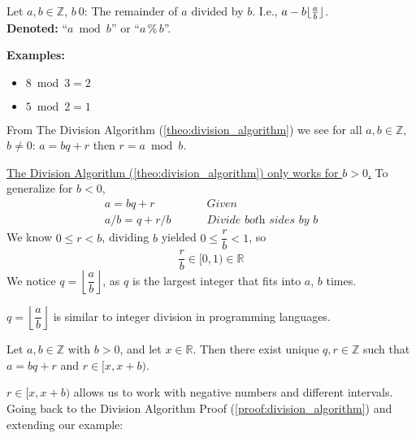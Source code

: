 \begin{Def}

    \label{def:mod_operator}

    Let $a,b\in\mathbb{Z}$, $b\>0$: The remainder of $a$ divided by $b$. I.e., $a-b\lfloor\frac{a}{b}\rfloor$.\\

    \noindent
    \textbf{Denoted:} ``$a\bmod b$'' or ``$a\,\%\,b$''.
\end{Def}

\noindent
\textbf{Examples:}
\begin{itemize}
    \item $8\bmod3=2$
    \item $5\bmod2=1$
\end{itemize}

\noindent
From The Division Algorithm (\ref{theo:division_algorithm}) we see for all $a,b\in\mathbb{Z}$, $b\neq0$:
$a=bq+r$ then $r=a\bmod b$.

\begin{Proof}
    \underline{The Division Algorithm (\ref{theo:division_algorithm}) only works for $b>0$.} To generalize for $b<0$,
    \begin{align*}
        a=bq+r \quad \quad    & \textit{ Given}                    \\
        a/b=q+r/b \quad \quad & \textit{ Divide both sides by $b$}
    \end{align*}
    \noindent
    We know $0\leq r<b$, dividing $b$ yielded $0\leq \dfrac{r}{b}<1$, so
    $$\dfrac{r}{b}\in[0,1)\in\mathbb{R}$$
    We notice $q=\left\lfloor\dfrac{a}{b}\right\rfloor$, as $q$ is the largest integer that fits into $a$, $b$ times.
\end{Proof}
\begin{Tip}
    $q=\left\lfloor\dfrac{a}{b}\right\rfloor$ is similar to integer division in programming languages.
\end{Tip}

\newpage

\begin{theo}

    Let $a, b \in \mathbb{Z}$ with $b > 0$, and let $x \in \mathbb{R}$. Then there exist unique $q, r \in \mathbb{Z}$ such that $a = bq + r$ and $r \in [x, x + b)$.
\end{theo}

\noindent
$r \in [x, x + b)$ allows us to work with negative numbers and different intervals. Going back
to the Division Algorithm Proof (\ref{proof:division_algorithm}) and extending our example:\\


